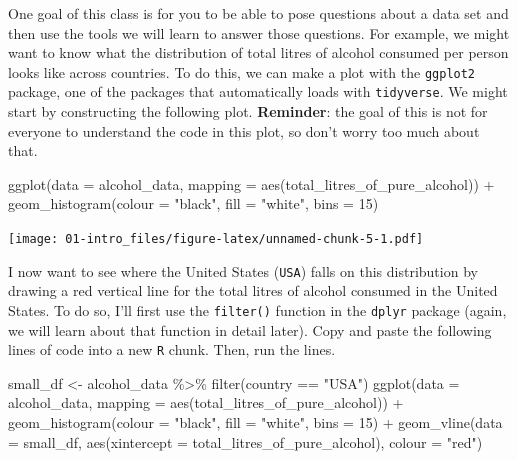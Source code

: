 \documentclass[
]{book}
\newenvironment{Shaded}{\begin{snugshade}}{\end{snugshade}}
\newcommand{\AttributeTok}[1]{\textcolor[rgb]{0.77,0.63,0.00}{#1}}
\newcommand{\DecValTok}[1]{\textcolor[rgb]{0.00,0.00,0.81}{#1}}
\newcommand{\FunctionTok}[1]{\textcolor[rgb]{0.00,0.00,0.00}{#1}}
\newcommand{\NormalTok}[1]{#1}
\newcommand{\OtherTok}[1]{\textcolor[rgb]{0.56,0.35,0.01}{#1}}
\newcommand{\SpecialCharTok}[1]{\textcolor[rgb]{0.00,0.00,0.00}{#1}}
\newcommand{\StringTok}[1]{\textcolor[rgb]{0.31,0.60,0.02}{#1}}
\begin{document}
One goal of this class is for you to be able to pose questions about a data set and then use the tools we will learn to answer those questions. For example, we might want to know what the distribution of total litres of alcohol consumed per person looks like across countries. To do this, we can make a plot with the \texttt{ggplot2} package, one of the packages that automatically loads with \texttt{tidyverse}. We might start by constructing the following plot. \textbf{Reminder}: the goal of this is not for everyone to understand the code in this plot, so don't worry too much about that.

\begin{Shaded}
\begin{Highlighting}[]
\FunctionTok{ggplot}\NormalTok{(}\AttributeTok{data =}\NormalTok{ alcohol\_data,}
       \AttributeTok{mapping =} \FunctionTok{aes}\NormalTok{(total\_litres\_of\_pure\_alcohol)) }\SpecialCharTok{+}
  \FunctionTok{geom\_histogram}\NormalTok{(}\AttributeTok{colour =} \StringTok{"black"}\NormalTok{, }\AttributeTok{fill =} \StringTok{"white"}\NormalTok{, }\AttributeTok{bins =} \DecValTok{15}\NormalTok{)}
\end{Highlighting}
\end{Shaded}

\texttt{[image: 01-intro\_files/figure-latex/unnamed-chunk-5-1.pdf]}

I now want to see where the United States (\texttt{USA}) falls on this distribution by drawing a red vertical line for the total litres of alcohol consumed in the United States. To do so, I'll first use the \texttt{filter()} function in the \texttt{dplyr} package (again, we will learn about that function in detail later). Copy and paste the following lines of code into a new \texttt{R} chunk. Then, run the lines.

\begin{Shaded}
\begin{Highlighting}[]
\NormalTok{small\_df }\OtherTok{\textless{}{-}}\NormalTok{ alcohol\_data }\SpecialCharTok{\%\textgreater{}\%} \FunctionTok{filter}\NormalTok{(country }\SpecialCharTok{==} \StringTok{"USA"}\NormalTok{)}
\FunctionTok{ggplot}\NormalTok{(}\AttributeTok{data =}\NormalTok{ alcohol\_data,}
       \AttributeTok{mapping =} \FunctionTok{aes}\NormalTok{(total\_litres\_of\_pure\_alcohol)) }\SpecialCharTok{+}
  \FunctionTok{geom\_histogram}\NormalTok{(}\AttributeTok{colour =} \StringTok{"black"}\NormalTok{, }\AttributeTok{fill =} \StringTok{"white"}\NormalTok{, }\AttributeTok{bins =} \DecValTok{15}\NormalTok{) }\SpecialCharTok{+}
  \FunctionTok{geom\_vline}\NormalTok{(}\AttributeTok{data =}\NormalTok{ small\_df,}
             \FunctionTok{aes}\NormalTok{(}\AttributeTok{xintercept =}\NormalTok{ total\_litres\_of\_pure\_alcohol),}
             \AttributeTok{colour =} \StringTok{"red"}\NormalTok{)}
\end{Highlighting}
\end{Shaded}
\end{document}

